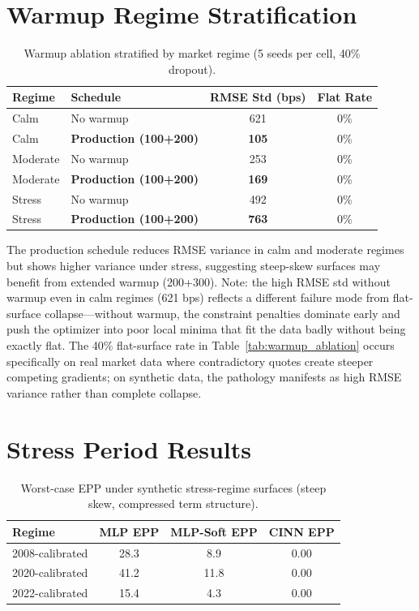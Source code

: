 \documentclass[11pt,a4paper]{article}
\begin{document}
\section{Warmup Regime Stratification}
\label{app:warmup_regimes}

\begin{table}[h]
\centering
\caption{Warmup ablation stratified by market regime (5 seeds per cell, 40\% dropout).}
\label{tab:warmup_stratified}
\begin{tabular}{llcc}
\toprule
\textbf{Regime} & \textbf{Schedule} & \textbf{RMSE Std (bps)} & \textbf{Flat Rate} \\
\midrule
Calm & No warmup & 621 & 0\% \\
Calm & \textbf{Production (100+200)} & \textbf{105} & 0\% \\
Moderate & No warmup & 253 & 0\% \\
Moderate & \textbf{Production (100+200)} & \textbf{169} & 0\% \\
Stress & No warmup & 492 & 0\% \\
Stress & \textbf{Production (100+200)} & \textbf{763} & 0\% \\
\bottomrule
\end{tabular}
\end{table}

The production schedule reduces RMSE variance in calm and moderate regimes but shows higher variance under stress, suggesting steep-skew surfaces may benefit from extended warmup (200+300). Note: the high RMSE std without warmup even in calm regimes (621 bps) reflects a different failure mode from flat-surface collapse---without warmup, the constraint penalties dominate early and push the optimizer into poor local minima that fit the data badly without being exactly flat. The 40\% flat-surface rate in Table~\ref{tab:warmup_ablation} occurs specifically on real market data where contradictory quotes create steeper competing gradients; on synthetic data, the pathology manifests as high RMSE variance rather than complete collapse.

\section{Stress Period Results}
\label{app:stress}

\begin{table}[h]
\centering
\caption{Worst-case EPP under synthetic stress-regime surfaces (steep skew, compressed term structure).}
\begin{tabular}{lccc}
\toprule
\textbf{Regime} & \textbf{MLP EPP} & \textbf{MLP-Soft EPP} & \textbf{CINN EPP} \\
\midrule
2008-calibrated & 28.3 & 8.9 & 0.00 \\
2020-calibrated & 41.2 & 11.8 & 0.00 \\
2022-calibrated & 15.4 & 4.3 & 0.00 \\
\bottomrule
\end{tabular}
\end{table}
\end{document}
